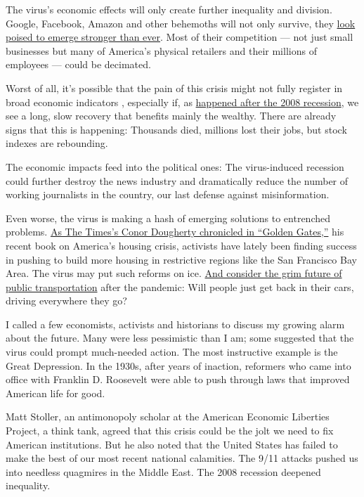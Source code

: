 The virus's economic effects will only create further inequality and
division. Google, Facebook, Amazon and other behemoths will not only
survive, they
\href{https://www.nytimes.com/2020/03/23/technology/coronavirus-facebook-amazon-youtube.html}{look
poised to emerge stronger than ever}. Most of their competition --- not
just small businesses but many of America's physical retailers and their
millions of employees --- could be decimated.

Worst of all, it's possible that the pain of this crisis might not fully
register in broad economic indicators , especially if, as
\href{https://www.nytimes.com/2019/09/18/opinion/obama-2008-financial-crisis.html}{happened
after the 2008 recession}, we see a long, slow recovery that benefits
mainly the wealthy. There are already signs that this is happening:
Thousands died, millions lost their jobs, but stock indexes are
rebounding.

The economic impacts feed into the political ones: The virus-induced
recession could further destroy the news industry and dramatically
reduce the number of working journalists in the country, our last
defense against misinformation.

Even worse, the virus is making a hash of emerging solutions to
entrenched problems.
\href{https://www.nytimes.com/2020/02/14/books/review/golden-gates-housing-conor-dougherty.html}{As
The Times's Conor Dougherty chronicled in ``Golden Gates,''} his recent
book on America's housing crisis, activists have lately been finding
success in pushing to build more housing in restrictive regions like the
San Francisco Bay Area. The virus may put such reforms on ice.
\href{https://qz.com/1824243/coronavirus-has-killed-off-public-transportation-across-the-world/}{And
consider the grim future of public transportation} after the pandemic:
Will people just get back in their cars, driving everywhere they go?

I called a few economists, activists and historians to discuss my
growing alarm about the future. Many were less pessimistic than I am;
some suggested that the virus could prompt much-needed action. The most
instructive example is the Great Depression. In the 1930s, after years
of inaction, reformers who came into office with Franklin D. Roosevelt
were able to push through laws that improved American life for good.

Matt Stoller, an antimonopoly scholar at the American Economic Liberties
Project, a think tank, agreed that this crisis could be the jolt we need
to fix American institutions. But he also noted that the United States
has failed to make the best of our most recent national calamities. The
9/11 attacks pushed us into needless quagmires in the Middle East. The
2008 recession deepened inequality.

